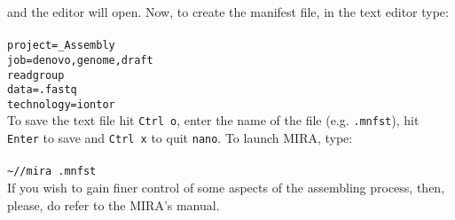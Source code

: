 and the editor will open. Now, to create the manifest file, in the text editor type:\\~\\
\texttt{project=\denovoReads\_Assembly\\
job=denovo,genome,draft\\
readgroup\\
data=\denovoReads.fastq\\
technology=iontor} \\

To save the text file hit \texttt{Ctrl o}, enter the name of the file (e.g. \texttt{\denovoReads.mnfst}),
hit \texttt{Enter} to save and \texttt{Ctrl x} to quit \texttt{nano}. To launch MIRA, type:\\~\\
\texttt{\textasciitilde/\binDir/mira \denovoReads.mnfst}\\

If you wish to gain finer control of some aspects of the assembling process,
then, please, do refer to the MIRA's manual.
